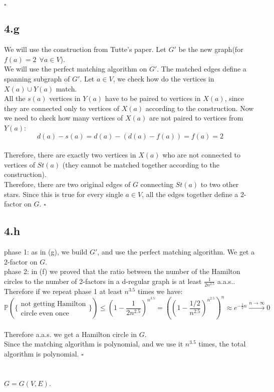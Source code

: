 \documentclass{article}
\begin{document}
\hfill $\square$

\subsection*{4.g}
We will use the construction from Tutte's paper. Let $G'$ be the new graph(for $f(a)=2\  \ \forall a \in V$).\\
We will use the perfect matching algorithm on $G'$. The matched edges define a spanning subgraph of $G'$.
Let $a \in V$, we check how do the vertices in $X(a)\cup Y(a)$ match.\\
All the $s(a)$ vertices in $Y(a)$ have to be paired to vertices in $X(a)$, since they are connected only to vertices of $X(a)$ according to the construction. Now we need to check how many vertices of $X(a)$ are not paired to vertices from $Y(a)$:\\
\[
d(a)-s(a)=d(a)-(d(a)-f(a))=f(a)=2
\]\\
Therefore, there are exactly two vertices in $X(a)$ who are not connected to vertices of $St(a)$ (they cannot be matched together according to the construction).\\
Therefore, there are two original edges of $G$ connecting $St(a)$ to two other stars. Since this is true for every single $a \in V$, all the edges together define a 2-factor on $G$.
\hfill $\square$

\subsection*{4.h}
phase 1: as in (g), we build $G'$, and use the perfect matching algorithm. We get a 2-factor on $G$.\\
phase 2: in (f) we proved that the ratio between the number of the Hamilton circles to the number of 2-factors in a d-regular graph is at least $\frac{1}{2n^{2.5}}$ a.a.s.. Therefore if we repeat phase 1 at least $n^{3.5}$ times we have:
\[
\mathbb{P}(\{\substack{\text{not getting Hamilton} \\ \text{circle even once}}\})\leq(1-\frac{1}{2n^{2.5}})^{n^{3.5}}=((1-\frac{1/2}{n^{2.5}})^{n^{2.5}})^n\approx e^{-\frac{1}{2}n}\xrightarrow{n \to \infty}0
\]\\
Therefore a.a.s. we get a Hamilton circle in $G$.\\
Since the matching algorithm is polynomial, and we use it $n^{3.5}$ times, the total algorithm is polynomial.
\hfill $\square$
\section{}
$G=G(V,E)$.
\end{document}
